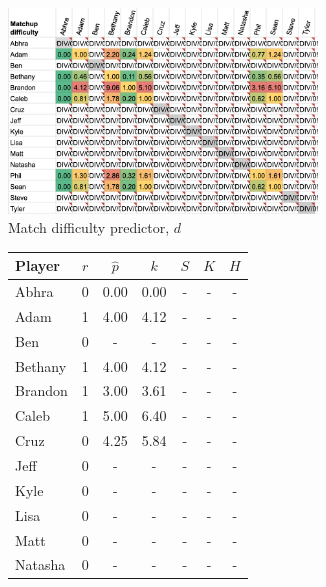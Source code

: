 \documentclass[letterpaper, 10 pt, conference]{ieeeconf}  %
\begin{document}
\begin{figure}[h!b]
        \begin{subfigure}[hb]{0.5\textwidth}
        \includegraphics[width=0.9\textwidth]{fig/difficulty_1.png}
        \caption{Match difficulty predictor, $d$}
        \end{subfigure}
        \begin{subfigure}[hb]{0.4\textwidth}
                \footnotesize
                \centering
                \begin{tabular}{lccc|ccc}
                        \toprule
                        Player  & $r$   & $\hat{p}$ & $k$ & $S$ & $K$ & $H$\\
                        \midrule
                        Abhra	& 0	& 0.00	& 0.00 & - & - & - \\
                        Adam	& 1	& 4.00	& 4.12 & - & - & - \\
                        Ben	& 0	& -	& -    & - & - & - \\
                        Bethany	& 1	& 4.00	& 4.12 & - & - & - \\
                        Brandon	& 1	& 3.00	& 3.61 & - & - & - \\
                        Caleb	& 1	& 5.00	& 6.40 & - & - & - \\
                        Cruz	& 0	& 4.25	& 5.84 & - & - & - \\
                        Jeff	& 0	& -	& -    & - & - & - \\
                        Kyle	& 0	& -  	& -    & - & - & - \\
                        Lisa	& 0	& -  	& -    & - & - & - \\
                        Matt	& 0	& -  	& -    & - & - & - \\
                        Natasha	& 0	& -  	& -    & - & - & - \\

\end{tabular}
\end{subfigure}
\end{figure}
\end{document}
